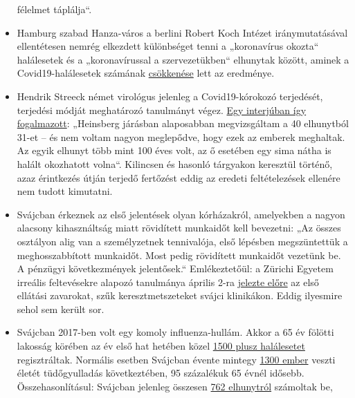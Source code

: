 \begin{itemize}
  félelmet táplálja``.
\item
  Hamburg szabad Hanza-város a berlini Robert Koch Intézet
  iránymutatásával ellentétesen nemrég elkezdett különbséget tenni a
  „koronavírus okozta`` halálesetek és a „koronavírussal a
  szervezetükben`` elhunytak között, aminek a Covid19-halálesetek
  számának
  \href{https://www.t-online.de/nachrichten/deutschland/id_87636856/coronavirus-hamburg-will-nur-echte-covid-19-tote-zaehlen.html}{csökkenése}
  lett az eredménye.
\item
  Hendrik Streeck német virológus jelenleg a Covid19-kórokozó
  terjedését, terjedési módját meghatározó tanulmányt végez.
  \href{https://www.zeit.de/wissen/gesundheit/2020-04/hendrik-streeck-covid-19-heinsberg-symptome-infektionsschutz-massnahmen-studie/komplettansicht}{Egy
  interjúban így fogalmazott}: „Heinsberg járásban alaposabban
  megvizsgáltam a 40 elhunytból 31-et -- és nem voltam nagyon
  meglepődve, hogy ezek az emberek meghaltak. Az egyik elhunyt több mint
  100 éves volt, az ő esetében egy sima nátha is halált okozhatott
  volna``. Kilincsen és hasonló tárgyakon keresztül történő, azaz
  érintkezés útján terjedő fertőzést eddig az eredeti feltételezések
  ellenére nem tudott kimutatni.
\item
  Svájcban érkeznek az első jelentések olyan kórházakról, amelyekben a
  nagyon alacsony kihasználtság miatt rövidített munkaidőt kell
  bevezetni: „Az összes osztályon alig van a személyzetnek tennivalója,
  első lépésben megszüntettük a meghosszabbított munkaidőt. Most pedig
  rövidített munkaidőt vezetünk be. A pénzügyi következmények
  jelentősek.`` Emlékeztetőül: a Zürichi Egyetem irreális feltevésekre
  alapozó tanulmánya április 2-ra
  \href{https://www.toponline.ch/news/coronavirus/detail/news/studie-bestaetigt-engpass-bei-spitalbetten-steht-kurz-bevor-00131333/}{jelezte
  előre} az első ellátási zavarokat, szűk keresztmetszeteket svájci
  klinikákon. Eddig ilyesmire sehol sem került sor.
\item
  Svájcban 2017-ben volt egy komoly influenza-hullám. Akkor a 65 év
  fölötti lakosság körében az év első hat hetében közel
  \href{https://www.srf.ch/news/schweiz/todesursachen-statistik-woran-die-meisten-schweizerinnen-und-schweizer-sterben}{1500
  plusz halálesetet} regisztráltak. Normális esetben Svájcban évente
  mintegy \href{https://www.nzz.ch/lungenentzuendung-1.4550285}{1300
  ember} veszti életét tüdőgyulladás következtében, 95 százalékuk 65
  évnél idősebb. Összehasonlításul: Svájcban jelenleg összesen
  \href{https://www.corona-data.ch/}{762 elhunytról} számoltak be,

\end{itemize}
